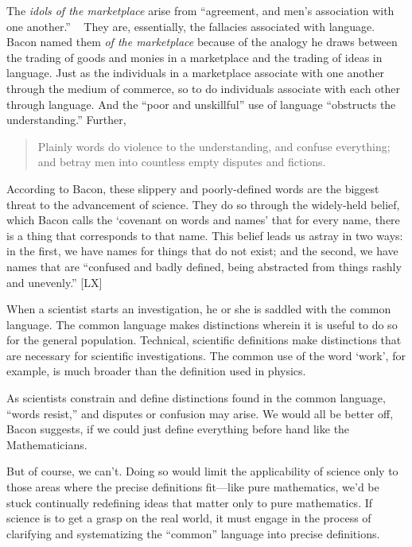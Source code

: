 The \emph{idols of the marketplace} arise from ``agreement, and men's association with one another.'' ~\citep[XLVII]{Bacon:2000kc} They are, essentially, the fallacies associated with language. Bacon named them \emph{of the marketplace} because of the analogy he draws between the trading of goods and monies in a marketplace and the trading of ideas in language. Just as the individuals in a marketplace associate with one another through the medium of commerce, so to do individuals associate with each other through language. And the ``poor and unskillful'' use of language ``obstructs the understanding.'' Further,

\begin{quote}

Plainly words do violence to the understanding, and confuse everything; and betray men into countless empty disputes and fictions. ~\citep[XLVII]{Bacon:2000kc}
\end{quote}

According to Bacon, these slippery and poorly-defined words are the biggest threat to the advancement of science. They do so through the widely-held belief, which Bacon calls the `covenant on words and names' that for every name, there is a thing that corresponds to that name. This belief leads us astray in two ways: in the first, we have names for things that do not exist; and the second, we have names that are ``confused and badly defined, being abstracted from things rashly and unevenly.'' [LX]

When a scientist starts an investigation, he or she is saddled with the common language. The common language makes distinctions wherein it is useful to do so for the general population. Technical, scientific definitions make distinctions that are necessary for scientific investigations. The common use of the word `work', for example, is much broader than the definition used in physics. 

As scientists constrain and define distinctions found in the common language, ``words resist,'' and disputes or confusion may arise. We would all be better off, Bacon suggests, if we could just define everything before hand like the Mathematicians.

But of course, we can't. Doing so would limit the applicability of science only to those areas where the precise definitions fit---like pure mathematics, we'd be stuck continually redefining ideas that matter only to pure mathematics. If science is to get a grasp on the real world, it must engage in the process of clarifying and systematizing the ``common'' language into precise definitions. 

